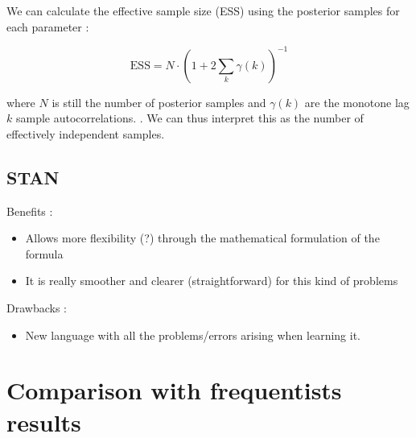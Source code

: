 \citet{hartmann_bayesian_2016}
We can calculate the effective sample size (ESS) using the posterior samples for each parameter : 

\begin{equation}
\text{ESS}=N\cdot (1+2\sum_k\gamma(k))^{-1}
\end{equation}

where $N$ is still the number of posterior samples and $\gamma(k)$ are the monotone lag $k$ sample autocorrelations. \citet{geyer__1992}. We can thus interpret this as the number of effectively independent samples. 


\subsection{STAN}

Benefits : 

\begin{itemize}
	\item Allows more flexibility (?) through the mathematical formulation of the formula
	\item It is really smoother and clearer (straightforward) for this kind of problems 
\end{itemize}

Drawbacks : 

\begin{itemize}
	\item New language with all the problems/errors arising when learning it. 
\end{itemize}



\section{Comparison with frequentists results}